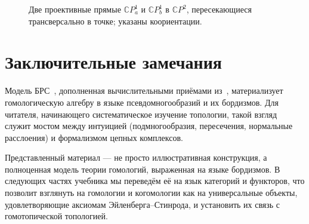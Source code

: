 \documentclass[12pt, twoside]{article}
\begin{document}
\begin{figure}
    \centering
    \caption{Две проективные прямые $\mathbb{C}P^1_a$ и $\mathbb{C}P^1_b$ в $\mathbb{C}P^2$, пересекающиеся трансверсально в точке; указаны коориентации.}
    \label{fig:cp2}
\end{figure}

\section{Заключительные замечания}

Модель БРС~\cite{BRS}, дополненная вычислительными приёмами из~\cite{Fenn}, материализует гомологическую алгебру в языке псевдомногообразий и их бордизмов. Для читателя, начинающего систематическое изучение топологии, такой взгляд служит мостом между интуицией (подмногообразия, пересечения, нормальные расслоения) и формализмом цепных комплексов.

Представленный материал — не просто иллюстративная конструкция, а полноценная модель теории гомологий, выраженная на языке бордизмов. В следующих частях учебника мы переведём её на язык категорий и функторов, что позволит взглянуть на гомологии и когомологии как на универсальные объекты, удовлетворяющие аксиомам Эйленберга–Стинрода, и установить их связь с гомотопической топологией.
\end{document}
